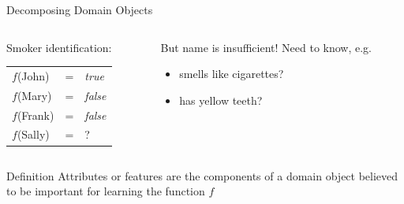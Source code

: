 \documentclass[14pt]{beamer}
\begin{document}
\begin{frame}{Decomposing Domain Objects}
	\begin{columns}
		\begin{column}{1.6in}
			Smoker identification: \\
			\smallskip
			\begin{tabular}{lll}
			$f$(John)  & = & \textit{true} \\
			$f$(Mary)  & = & \textit{false} \\
			$f$(Frank) & = & \textit{false} \\
			$f$(Sally) & = & ?
			\end{tabular}
		\end{column}
		\pause
		\begin{column}{2.6in}
			\begin{block}{But name is insufficient!}
				Need to know, e.g.
				\begin{itemize}
					\item smells like cigarettes?
					\item has yellow teeth?
				\end{itemize}
			\end{block}
		\end{column}
	\end{columns}
	\bigskip
	\pause
	\begin{block}{Definition}
		\alert{Attributes} or \alert{features} are the components of a domain object believed to be important for learning the function $f$
	\end{block}
\end{frame}
\end{document}
